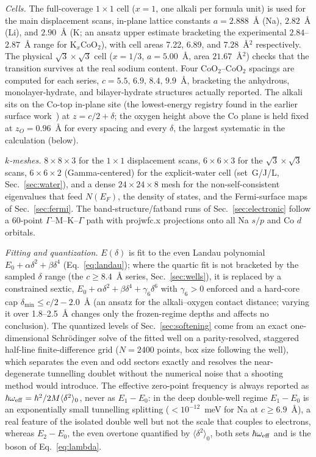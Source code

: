 \documentclass[aps,10pt,preprint,superscriptaddress,floatfix]{revtex4-2}
\begin{document}
\emph{Cells.} The full-coverage $1\times1$ cell ($x=1$, one alkali per formula unit) is used for
the main displacement scans, in-plane lattice constants $a=2.888$~\AA{} (Na), $2.82$~\AA{} (Li),
and $2.90$~\AA{} (K; an ansatz upper estimate bracketing the experimental $2.84$--$2.87$~\AA{}
range for K$_x$CoO$_2$), with cell areas 7.22, 6.89, and $7.28$~\AA$^2$ respectively. The physical
$\sqrt3\times\sqrt3$ cell ($x=1/3$, $a=5.00$~\AA, area $21.67$~\AA$^2$) checks that the transition
survives at the real sodium content. Four CoO$_2$--CoO$_2$ spacings are computed for each series,
$c=5.5,\,6.9,\,8.4,\,9.9$~\AA, bracketing the anhydrous, monolayer-hydrate, and bilayer-hydrate
structures actually reported. The alkali sits on the Co-top in-plane site (the lowest-energy
registry found in the earlier surface work~\cite{RadhaLambrecht2021}) at $z=c/2+\delta$; the oxygen
height above the Co plane is held fixed at $z_O=0.96$~\AA{} for every spacing and every $\delta$,
the largest systematic in the calculation (below).

\emph{$k$-meshes.} $8\times8\times3$ for the $1\times1$ displacement scans, $6\times6\times3$ for
the $\sqrt3\times\sqrt3$ scans, $6\times6\times2$ (Gamma-centered) for the explicit-water cell
(set~G/J/L, Sec.~\ref{sec:water}), and a dense $24\times24\times8$ mesh for the
non-self-consistent eigenvalues that feed $N(E_F)$, the density of states, and the Fermi-surface maps
of Sec.~\ref{sec:fermi}. The band-structure/fatband runs of Sec.~\ref{sec:electronic} follow a
60-point $\Gamma$--M--K--$\Gamma$ path with {\sc projwfc.x} projections onto all Na $s/p$ and Co
$d$ orbitals.

\emph{Fitting and quantization.} $E(\delta)$ is fit to the even Landau polynomial
$E_0+\alpha\delta^2+\beta\delta^4$ (Eq.~\eqref{eq:landau}); where the quartic fit is not bracketed
by the sampled $\delta$ range (the $c\geq8.4$~\AA{} series, Sec.~\ref{sec:wells}), it is replaced
by a constrained sextic, $E_0+\alpha\delta^2+\beta\delta^4+\gamma_6\delta^6$ with $\gamma_6>0$
enforced and a hard-core cap $\delta_{\min}\leq c/2-2.0$~\AA{} (an ansatz for the alkali--oxygen
contact distance; varying it over 1.8--2.5~\AA{} changes only the frozen-regime depths and
affects no conclusion). The quantized levels of Sec.~\ref{sec:softening} come from an exact one-dimensional
Schr\"odinger solve of the fitted well on a parity-resolved, staggered half-line finite-difference
grid ($N=2400$ points, box size following the well), which separates the even and odd sectors
exactly and resolves the near-degenerate tunnelling doublet without the numerical noise that a
shooting method would introduce. The effective zero-point frequency is always reported as
$\hbar\omega_{\rm eff}=\hbar^2/2M\langle\delta^2\rangle_0$, never as $E_1-E_0$: in the deep
double-well regime $E_1-E_0$ is an exponentially small tunnelling splitting ($<10^{-12}$~meV for
Na at $c\geq6.9$~\AA), a real feature of the isolated double well but not the scale that couples to
electrons, whereas $E_2-E_0$, the even overtone quantified by $\langle\delta^2\rangle_0$, both sets
$\hbar\omega_{\rm eff}$ and is the boson of Eq.~\eqref{eq:lambda}.
\end{document}
